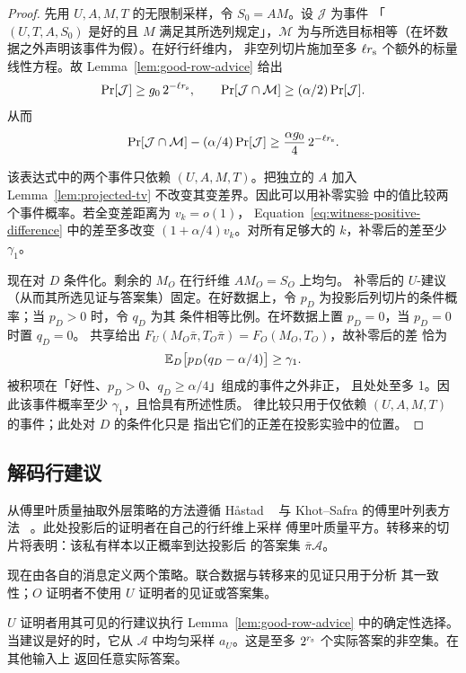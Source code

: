 \begin{proof}
先用 $U,A,M,T$ 的无限制采样，令 $S_0=AM$。设 $\mathcal J$ 为事件
「$(U,T,A,S_0)$ 是好的且 $M$ 满足其所选列规定」，$\mathcal M$
为与所选目标相等（在坏数据之外声明该事件为假）。在好行纤维内，
非空列切片施加至多 $\ell r_{\rm s}$ 个额外的标量线性方程。故
Lemma~\ref{lem:good-row-advice} 给出
\[
 \Pr[\mathcal J]\ge g_0\,2^{-\ell r_{\rm s}},
 \qquad
 \Pr[\mathcal J\cap\mathcal M]\ge(\alpha/2)\Pr[\mathcal J].
\]
从而
\begin{equation}
 \Pr[\mathcal J\cap\mathcal M]
       -(\alpha/4)\Pr[\mathcal J]
 \ge\frac{\alpha g_0}{4}\,2^{-\ell r_{\rm s}}.
 \label{eq:witness-positive-difference}
\end{equation}

该表达式中的两个事件只依赖 $(U,A,M,T)$。把独立的 $A$ 加入
Lemma~\ref{lem:projected-tv} 不改变其变差界。因此可以用补零实验
中的值比较两个事件概率。若全变差距离为 $v_k=o(1)$，
Equation~\eqref{eq:witness-positive-difference} 中的差至多改变
$(1+\alpha/4)v_k$。对所有足够大的 $k$，补零后的差至少 $\gamma_1$。

现在对 $D$ 条件化。剩余的 $M_O$ 在行纤维 $AM_O=S_O$ 上均匀。
补零后的 $U$-建议（从而其所选见证与答案集）固定。在好数据上，令
$p_D$ 为投影后列切片的条件概率；当 $p_D>0$ 时，令 $q_D$ 为其
条件相等比例。在坏数据上置 $p_D=0$，当 $p_D=0$ 时置 $q_D=0$。
共享给出 $F_U(M_O\bar\pi,T_O\bar\pi)=F_O(M_O,T_O)$，故补零后的差
恰为
\[
 \mathbb E_D\bigl[p_D(q_D-\alpha/4)\bigr]\ge\gamma_1.
\]
被积项在「好性、$p_D>0$、$q_D\ge\alpha/4$」组成的事件之外非正，
且处处至多 1。因此该事件概率至少 $\gamma_1$，且恰具有所述性质。
律比较只用于仅依赖 $(U,A,M,T)$ 的事件；此处对 $D$ 的条件化只是
指出它们的正差在投影实验中的位置。
\end{proof}

\subsection{解码行建议}

从傅里叶质量抽取外层策略的方法遵循 H\aa stad
~\cite[Section~1.1]{Hastad01} 与 Khot--Safra 的傅里叶列表方法
~\cite[Section~1.1]{KS13}。此处投影后的证明者在自己的行纤维上采样
傅里叶质量平方。转移来的切片将表明：该私有样本以正概率到达投影后
的答案集 $\bar\pi\mathcal A$。

现在由各自的消息定义两个策略。联合数据与转移来的见证只用于分析
其一致性；$O$ 证明者不使用 $U$ 证明者的见证或答案集。

$U$ 证明者用其可见的行建议执行 Lemma~\ref{lem:good-row-advice}
中的确定性选择。当建议是好的时，它从 $\mathcal A$ 中均匀采样
$a_U$。这是至多 $2^{r_{\rm s}}$ 个实际答案的非空集。在其他输入上
返回任意实际答案。

